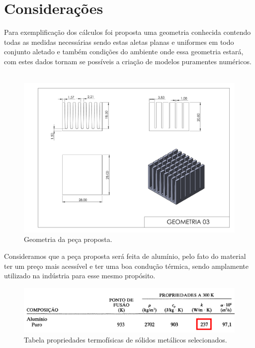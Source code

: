 {\let\clearpage\relax\chapter{Considerações}\label{cap:definitions}}

Para exemplificação dos cálculos foi proposta uma geometria conhecida contendo todas as medidas necessárias sendo estas aletas planas e uniformes em todo conjunto aletado e também condições do ambiente onde essa geometria estará, com estes dados tornam se possíveis a criação de modelos puramentes numéricos.
\\
\\
\begin{figure}[h]
    \centering
    \caption{Geometria da peça proposta.}
    \label{fig:geometry}
    \includegraphics[width=15cm]{figuras/geometria.pdf}
\end{figure}

Consideramos que a peça proposta será feita de alumínio, pelo fato do material ter um preço mais acessível e ter uma boa condução térmica, sendo amplamente utilizado na indústria para esse mesmo propósito.

\begin{figure}[h]
    \centering
    \caption{Tabela propriedades termofísicas de sólidos metálicos selecionados.}
    \label{fig:metalProps}
    \includegraphics[width=14cm]{figuras/metalProps.jpg}
\end{figure}

